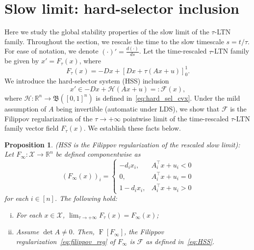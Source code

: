 \documentclass[letterpaper, conference]{ieeeconf}
\newcommand{\R}{\mathbb R}
\newcommand{\X}{\mathcal X}
\newtheorem{proposition}[theorem]{Proposition}
\newcommand{\longthmtitle}[1]{\mbox{}{\textit{(#1):}}}
\newcommand{\1}{\mathbf{1}}
\newcommand{\mc}{\mathcal}
\begin{document}
\section{Slow limit: hard-selector inclusion}
Here we study the global stability properties of the slow limit of the $\tau$-LTN family. 
Throughout the section, we rescale the time to the slow timescale \(s = t/\tau\). For ease of notation, we denote \((\cdot)' = \tfrac{d(\cdot)}{ds}\).
Let the time-rescaled \(\tau\)-LTN family be given by \(x' = F_\tau(x)\), where
\begin{equation}\label{eq:t-LTN_slow}
     F_\tau(x) = -Dx+[Dx+\tau (Ax + u)]_0^1.
\end{equation}
We introduce the hard-selector system (HSS) inclusion
\begin{equation}\label{eq:HSS}\tag{HSS}
 x' \in -Dx+\mc H(Ax + u) =: \mc F(x),
\end{equation}
where \(\mc H:\R^n \rightarrow \mathfrak B([0,1]^n)\) is defined in~\eqref{eq:hard_sel_cvx}.
Under the mild assumption of \(A\) being invertible (automatic under LDS), we show that 
\(\mc F\)
is the Filippov regularization of the \(\tau \to +\infty\) pointwise limit of the time-rescaled \(\tau\)-LTN family vector field \(F_\tau(x)\).
We establish these facts below.
\begin{proposition}\longthmtitle{HSS is the Filippov regularization of the rescaled slow limit}
\label{prop:t-LTN_to_slow_limit}
Let \(F_\infty: \X \rightarrow \R^n\) be defined componentwise as
\begin{equation}\label{eq:slow_pointwise}
(F_\infty(x))_i = \begin{cases}
    - d_ix_i, & A_i^\top x + u_i < 0\\
    0, & A_i^\top x + u_i = 0\\
    1 - d_ix_i, & A_i^\top x + u_i > 0
\end{cases}
\end{equation}
for each \(i \in [n]\).
The following hold:
    \begin{enumerate}[(i)]
        \item For each \(x \in \X\),
        \(\lim_{\tau\to+\infty} F_\tau(x) = F_\infty(x)\);
        \item Assume \(\det A\neq 0\).
        Then, \(\operatorname{F}[F_\infty]\), the Filippov regularization~\eqref{eq:filippov_reg} of \(F_\infty\) is \(\mc F\) as defined in~\eqref{eq:HSS}.
    \end{enumerate}
\end{proposition}
\end{document}
